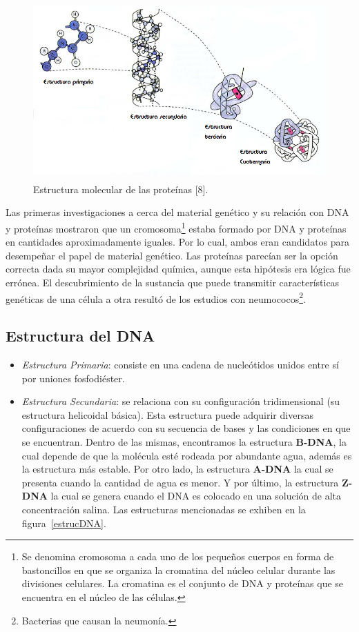 \begin{itemize}
    \begin{figure} [h]
	    \begin{center}
		    \includegraphics[width=5.7209in,height=2.7000in]{image/estructuraProteina.png}
		    \caption{Estructura molecular de las proteínas [8].}
		    \label{proteina}
	    \end{center}
    \end{figure}	
\end{itemize}

Las primeras investigaciones a cerca del material genético y su relación con DNA y proteínas mostraron que un cromosoma\footnote{Se denomina cromosoma a cada uno de los pequeños cuerpos en forma de bastoncillos en que se organiza la cromatina del núcleo celular durante las divisiones celulares. La cromatina es el conjunto de DNA y proteínas que se encuentra en el núcleo de las células.} estaba formado por DNA y proteínas en cantidades aproximadamente iguales. Por lo cual, ambos eran candidatos para desempeñar el papel de material genético. Las proteínas parecían ser la opción correcta dada su mayor complejidad química, aunque esta hipótesis era lógica fue errónea. 
El descubrimiento de la sustancia que puede transmitir características genéticas de una célula a otra resultó de los estudios con neumococos\footnote{Bacterias que causan la neumonía.}\cite{curtis}.

\subsection{Estructura del DNA}
\begin{itemize}
	\item \emph{Estructura Primaria}: consiste en una cadena de nucleótidos unidos entre sí por uniones fosfodiéster. 
	\item \emph{Estructura Secundaria}: se relaciona con su configuración tridimensional (su 		
				estructura helicoidal básica). Esta estructura puede adquirir diversas configuraciones de acuerdo con su secuencia de bases y las condiciones en que
				se encuentran.
				Dentro de las mismas, encontramos la estructura \textbf{B-DNA}, la cual depende de que la molécula esté rodeada por abundante agua, además es la estructura más estable. Por otro lado, la estructura \textbf{A-DNA} la cual se presenta cuando la cantidad de agua es menor. Y por último, la estructura \textbf{Z-DNA} la cual se genera cuando
				el DNA es colocado en una solución de alta concentración salina. Las estructuras mencionadas se exhiben en la figura~\ref{estrucDNA}.
\end{itemize}

